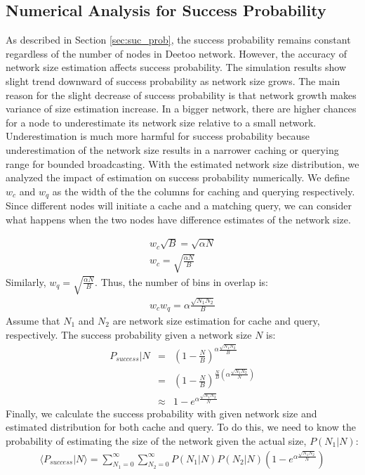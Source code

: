 \documentclass[conference]{IEEEtran}
\begin{document}
\subsection{Numerical Analysis for Success Probability}
As described in Section \ref{sec:suc_prob}, the success probability remains constant 
regardless of the number of nodes in Deetoo network. However, 
the accuracy of network size estimation affects success probability.
The simulation results show slight trend downward of success probability as network size grows. 
The main reason for the slight decrease of success probability is that network 
growth makes variance of size estimation increase. In a bigger network, there are higher 
chances for a node to underestimate its network size relative to a small network. 
Underestimation is much more harmful for success probability because underestimation 
of the network size results in a narrower caching or querying range for bounded broadcasting. 
With the estimated network size distribution, 
we analyzed the impact of estimation on success probability numerically.  
We define $w_c$ and $w_q$ as the width of the the columns for caching and
querying respectively.  Since different nodes will initiate a cache and a
matching query, we can consider what happens when the two nodes have
difference estimates of the network size.

\begin{eqnarray*}
w_c \sqrt{B} = \sqrt{\alpha N} \\
w_c = \sqrt{\frac{\alpha N}{B}}
\end{eqnarray*}
Similarly, $w_q = \sqrt{\frac{\alpha N}{B}}$. 
Thus, the number of bins in overlap is:
\begin{eqnarray*}
w_c w_q = \alpha\frac{\sqrt{N_1 N_2}}{B}
\end{eqnarray*}
Assume that $N_1$ and $N_2$ are network size estimation for cache and query, 
respectively.
The success probability given a network size $N$ is:
\begin{eqnarray*}
P_{success}|N &=& \left(1-\frac{N}{B}\right)^{\alpha \frac{\sqrt{N_1 N_2}}{B}} \\
  &=& \left(1-\frac{N}{B}\right)^{\frac{N}{B}(\alpha \frac{\sqrt{N_1 N_2}}{N})} \\
  &\approx& 1-e^{\alpha \frac{\sqrt{N_1 N_2}}{N}}
\end{eqnarray*}
Finally, we calculate the success probability with given network size and
estimated distribution for both cache and query.  To do this, we need to know
the probability of estimating the size of the network given the actual size,
$P(N_1|N)$:
\begin{eqnarray*}
\langle P_{success} | N\rangle = \sum_{N_1=0}^{\infty}\sum_{N_2=0}^{\infty}P(N_1|N)P(N_2|N)\left(1-e^{\alpha \frac{\sqrt{N_1 N_2}}{N}}\right)
\end{eqnarray*}
\end{document}
